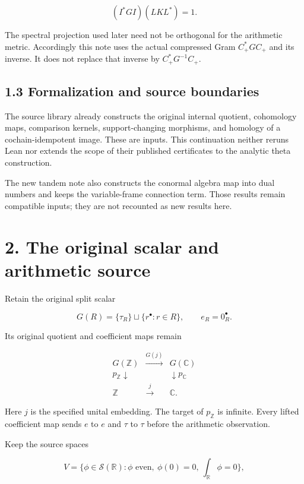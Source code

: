 \documentclass[
  11pt,
]{article}
\begin{document}
\[
(I^*GI)(LKL^*)=1.
\]

The spectral projection used later need not be orthogonal for the
arithmetic metric. Accordingly this note uses the actual compressed Gram
\(C_+^*GC_+\) and its inverse. It does not replace that inverse by
\(C_+^*G^{-1}C_+\).

\subsection{1.3 Formalization and source
boundaries}\label{formalization-and-source-boundaries}

The source library already constructs the original internal quotient,
cohomology maps, comparison kernels, support-changing morphisms, and
homology of a cochain-idempotent image. These are inputs. This
continuation neither reruns Lean nor extends the scope of their
published certificates to the analytic theta construction.

The new tandem note also constructs the conormal algebra map into dual
numbers and keeps the variable-frame connection term. Those results
remain compatible inputs; they are not recounted as new results here.

\section{2. The original scalar and arithmetic
source}\label{the-original-scalar-and-arithmetic-source}

Retain the original split scalar

\[
G(R)=\{\tau_R\}\sqcup\{r^\bullet:r\in R\},
\qquad e_R=0_R^\bullet.
\]

Its original quotient and coefficient maps remain

\[
\boxed{
\begin{array}{ccc}
G(\mathbb Z)&\xrightarrow{G(j)}&G(\mathbb C)\\
p_{\mathbb Z}\downarrow&&\downarrow p_{\mathbb C}\\
\mathbb Z&\xrightarrow{j}&\mathbb C.
\end{array}
}
\]

Here \(j\) is the specified unital embedding. The target of
\(p_{\mathbb Z}\) is infinite. Every lifted coefficient map sends \(e\)
to \(e\) and \(\tau\) to \(\tau\) before the arithmetic observation.

Keep the source spaces

\[
V=\{\phi\in\mathcal S(\mathbb R):\phi\text{ even},\ \phi(0)=0,\ \int_{\mathbb R}\phi=0\},
\]
\end{document}
